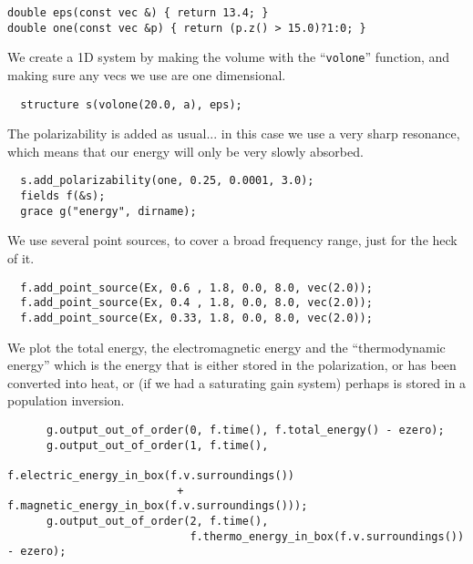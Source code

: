 \begin{verbatim}
double eps(const vec &) { return 13.4; }
double one(const vec &p) { return (p.z() > 15.0)?1:0; }
\end{verbatim}
\begin{comment}
int main(int argc, char **argv) {
  initialize mpi(argc, argv);
  deal_with_ctrl_c();
  const double ttot = 600.0;
\end{comment}
We create a 1D system by making the volume with the ``\verb!volone!''
function, and making sure any vecs we use are one dimensional.
\begin{verbatim}
  structure s(volone(20.0, a), eps);
\end{verbatim}
\begin{comment}
  const char *dirname = make_output_directory(__FILE__);
  s.set_output_directory(dirname);
\end{comment}
The polarizability is added as usual... in this case we use a very sharp
resonance, which means that our energy will only be very slowly absorbed.
\begin{verbatim}
  s.add_polarizability(one, 0.25, 0.0001, 3.0);
  fields f(&s);
  grace g("energy", dirname);
\end{verbatim}
We use several point sources, to cover a broad frequency range, just for
the heck of it.
\begin{verbatim}
  f.add_point_source(Ex, 0.6 , 1.8, 0.0, 8.0, vec(2.0));
  f.add_point_source(Ex, 0.4 , 1.8, 0.0, 8.0, vec(2.0));
  f.add_point_source(Ex, 0.33, 1.8, 0.0, 8.0, vec(2.0));
\end{verbatim}
\begin{comment}
  const double ezero = f.total_energy();
  double next_printtime = 10;
  while (f.time() < ttot && !interrupt) {
    if (f.time() >= next_printtime) {
      next_printtime += 10;
      master_printf("Working on time %
      master_printf("energy is %
      master_printf("thermo energy is %
      //f.eps_slices();
\end{comment}
We plot the total energy, the electromagnetic energy and the
``thermodynamic energy'' which is the energy that is either stored in the
polarization, or has been converted into heat, or (if we had a saturating
gain system) perhaps is stored in a population inversion.
\begin{verbatim}
      g.output_out_of_order(0, f.time(), f.total_energy() - ezero);
      g.output_out_of_order(1, f.time(),
                            f.electric_energy_in_box(f.v.surroundings())
                          + f.magnetic_energy_in_box(f.v.surroundings()));
      g.output_out_of_order(2, f.time(),
                            f.thermo_energy_in_box(f.v.surroundings()) - ezero);
\end{verbatim}
\begin{comment}
    }
    f.step();
  }
}
\end{comment}
